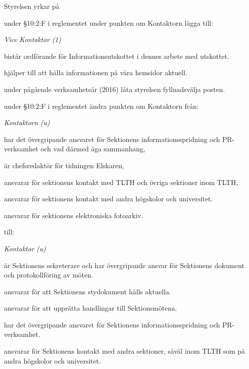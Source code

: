 \documentclass[../_main/handlingar.tex]{subfiles}
\begin{document}
Styrelsen yrkar på
\begin{attsatser}
    \att under \S10:2:F i reglementet under punkten om Kontaktorn lägga till:\par
    {\it
    Vice Kontaktor (1)
    \begin{tightdashlist}
        \item bistår ordförande för Informationsutskottet i dennes arbete med utskottet.
        \item hjälper till att hålla informationen på våra hemsidor aktuell.
    \end{tightdashlist}
    }
    \att under pågående verksamhetsår (2016) låta styrelsen fyllnadsvälja posten.

    \newpage

    \att under \S10:2:F i reglementet ändra punkten om Kontaktorn från:\par
    {\it
    Kontaktorn (u)
    \begin{tightdashlist}
        \item har det övergripande ansvaret för Sektionens informationsspridning och PR-verksamhet och vad därmed äga sammanhang,
        \item är chefsredaktör för tidningen Elskaren,
        \item ansvarar för sektionens kontakt med TLTH och övriga sektioner inom TLTH,
        \item ansvarar för sektionens kontakt med andra högskolor och universitet.
        \item ansvarar för sektionens elektroniska fotoarkiv.
    \end{tightdashlist}
    }
    till:\par
    {\it
    Kontaktor (u)
    \begin{tightdashlist}
        \item är Sektionens sekreterare och har övergripande ansvar för Sektionens dokument och protokollföring av möten.
        \item ansvarar för att Sektionens stydokument hålls aktuella.
        \item ansvarar för att upprätta handlingar till Sektionsmötena.
        \item har det övergripande ansvaret för Sektionens informationsspridning och PR-verksamhet.
        \item ansvarar för Sektionens kontakt med andra sektioner, såväl inom TLTH som på andra högskolor och universitet.
    \end{tightdashlist}
    }


\end{attsatser}
\end{document}
